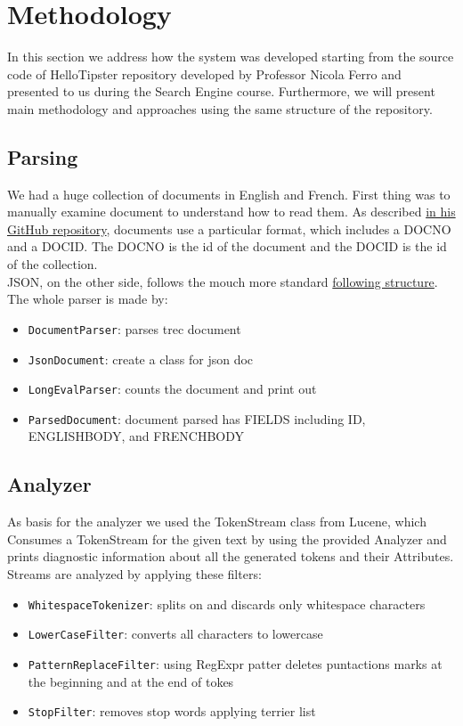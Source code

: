\section{Methodology}
\label{sec:methodology}
In this section we address how the system was developed starting from the source code of
HelloTipster\cite{tipser} repository developed by Professor Nicola Ferro
and presented to us during the Search Engine course.
Furthermore, we will present main methodology and approaches
using the same structure of the repository\cite{jihuming}.

\subsection{Parsing}
We had a huge collection of documents in English and French. First thing
was to manually examine document to understand how to read them. As described
\href{https://github.com/joaopalotti/trectools}{in his GitHub repository},
documents use a particular format, which includes a DOCNO and a DOCID.
The DOCNO is the id of the document and the DOCID is the id of the collection.\\
JSON, on the other side, follows the mouch more standard
\href{https://github.com/castorini/anserini/issues/1111}{following structure}.\\
The whole parser is made by:
\begin{itemize}
    \item \texttt{DocumentParser}: parses trec document
    \item \texttt{JsonDocument}: create a class for json doc
    \item \texttt{LongEvalParser}: counts the document and print out
    \item \texttt{ParsedDocument}: document parsed has FIELDS including ID,
    ENGLISH\textunderscore BODY, and FRENCH\textunderscore BODY
\end{itemize}
\subsection{Analyzer}
As basis for the analyzer we used the TokenStream class from Lucene, which 
Consumes a TokenStream for the given text by using the provided
Analyzer and prints diagnostic information about all the generated tokens and
their Attributes.\\
Streams are analyzed by applying these filters:
\begin{itemize}
    \item \texttt{WhitespaceTokenizer}: splits on and discards only
    whitespace characters
    \item \texttt{LowerCaseFilter}: converts all characters to lowercase
    \item \texttt{PatternReplaceFilter}: using RegExpr patter deletes puntactions
    marks at the beginning and at the end of tokes
    \item \texttt{StopFilter}: removes stop words applying terrier list\cite{stopword}
\end{itemize}

